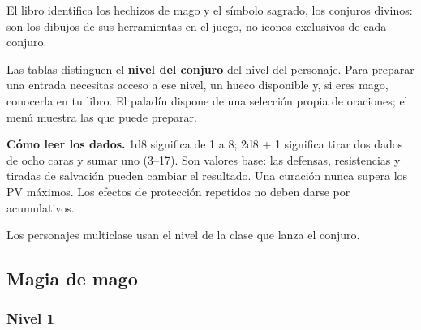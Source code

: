 El libro identifica los hechizos de mago y el símbolo sagrado, los conjuros divinos: son los dibujos de sus herramientas en el juego, no iconos exclusivos de cada conjuro.

Las tablas distinguen el \textbf{nivel del conjuro} del nivel del personaje. Para preparar una entrada necesitas acceso a ese nivel, un hueco disponible y, si eres mago, conocerla en tu libro. El paladín dispone de una selección propia de oraciones; el menú muestra las que puede preparar.

\textbf{Cómo leer los dados.} 1d8 significa de 1 a 8; 2d8 + 1 significa tirar dos dados de ocho caras y sumar uno (3--17). Son valores base: las defensas, resistencias y tiradas de salvación pueden cambiar el resultado. Una curación nunca supera los PV máximos. Los efectos de protección repetidos no deben darse por acumulativos.

Los personajes multiclase usan el nivel de la clase que lanza el conjuro.

\subsection*{Magia de mago}

\subsubsection*{Nivel 1}

